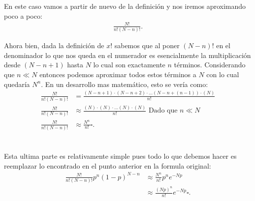\documentclass{report}
\begin{document}
\section{}

En este caso vamos a partir de nuevo de la definición y nos iremos aproximando poco a poco:
\begin{align*}
  \frac{N!}{n!\left( N - n \right)!}
.\end{align*}

Ahora bien, dada la definición de $x!$ sabemos que al poner $\left( N - n \right)!$ en el denominador lo que nos queda en el numerador es esencialmente la multiplicación desde $\left( N - n + 1 \right) $ hasta $N$ lo cual son exactamente  $n$ términos. Considerando que $n \ll N$ entonces podemos aproximar todos estos términos a $N$ con lo cual quedaría  $N^{n}$. En un desarrollo mas matemático, esto se vería como:
\begin{align*}
  \frac{N!}{n!\left( N - n \right)!} &= \frac{\left( N - n + 1 \right) \cdot \left( N - n + 2 \right) \cdot \ldots \left( N - n + (n - 1) \right)  \cdot \left( N \right) }{n!} \\
  \frac{N!}{n!\left( N - n \right)!} &\approx \frac{\left( N \right) \cdot \left( N  \right) \cdot \ldots \left( N  \right)  \cdot \left( N \right) }{n!} \text{ Dado que } n \ll N\\
  \frac{N!}{n!\left( N - n \right)!} &\approx \frac{N^{n}}{n!} \square
.\end{align*}

\section{}

Esta ultima parte es relativamente simple pues todo lo que debemos hacer es reemplazar lo encontrado en el punto anterior en la formula original:
\begin{align*}
  \frac{N!}{n!\left( N - n \right)!} p^{n}\left( 1 - p \right)^{N - n} &\approx \frac{N^{n}}{n!}p^n e^{-Np}\\
  & \approx \frac{\left(Np\right)^n}{n!}e^{-Np} \square
.\end{align*}
\end{document}
